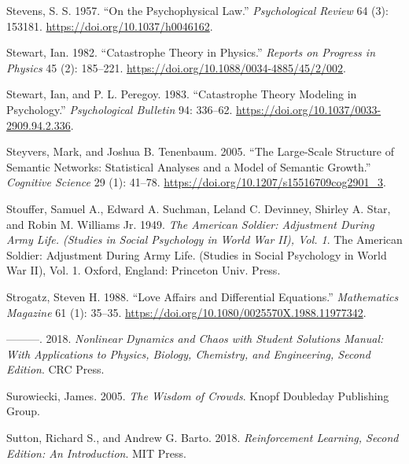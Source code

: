 \documentclass[
  letterpaper,
]{scrbook}
\newlength{\cslhangindent}
\newlength{\cslentryspacingunit} %
\newenvironment{CSLReferences}[2] %
 {%
  \setlength{\parindent}{0pt}
  \ifodd #1
  \let\oldpar\par
  \def\par{\hangindent=\cslhangindent\oldpar}
  \fi
  \setlength{\parskip}{#2\cslentryspacingunit}
 }%
 {}
\begin{document}
\begin{CSLReferences}{1}{0}
\leavevmode{}%
Stevens, S. S. 1957. {``On the Psychophysical Law.''}
\emph{Psychological Review} 64 (3): 153181.
\url{https://doi.org/10.1037/h0046162}.

\leavevmode{}%
Stewart, Ian. 1982. {``Catastrophe Theory in Physics.''} \emph{Reports
on Progress in Physics} 45 (2): 185--221.
\url{https://doi.org/10.1088/0034-4885/45/2/002}.

\leavevmode{}%
Stewart, Ian, and P. L. Peregoy. 1983. {``Catastrophe Theory Modeling in
Psychology.''} \emph{Psychological Bulletin} 94: 336--62.
\url{https://doi.org/10.1037/0033-2909.94.2.336}.

\leavevmode{}%
Steyvers, Mark, and Joshua B. Tenenbaum. 2005. {``The {Large-Scale
Structure} of {Semantic Networks}: {Statistical Analyses} and a {Model}
of {Semantic Growth}.''} \emph{Cognitive Science} 29 (1): 41--78.
\url{https://doi.org/10.1207/s15516709cog2901_3}.

\leavevmode{}%
Stouffer, Samuel A., Edward A. Suchman, Leland C. Devinney, Shirley A.
Star, and Robin M. Williams Jr. 1949. \emph{The {American} Soldier:
{Adjustment} During Army Life. ({Studies} in Social Psychology in {World
War II}), {Vol}. 1}. The {American} Soldier: {Adjustment} During Army
Life. ({Studies} in Social Psychology in {World War II}), {Vol}. 1.
{Oxford, England}: {Princeton Univ. Press}.

\leavevmode{}%
Strogatz, Steven H. 1988. {``Love {Affairs} and {Differential
Equations}.''} \emph{Mathematics Magazine} 61 (1): 35--35.
\url{https://doi.org/10.1080/0025570X.1988.11977342}.

\leavevmode{}%
---------. 2018. \emph{Nonlinear {Dynamics} and {Chaos} with {Student
Solutions Manual}: {With Applications} to {Physics}, {Biology},
{Chemistry}, and {Engineering}, {Second Edition}}. {CRC Press}.

\leavevmode{}%
Surowiecki, James. 2005. \emph{The {Wisdom} of {Crowds}}. {Knopf
Doubleday Publishing Group}.

\leavevmode{}%
Sutton, Richard S., and Andrew G. Barto. 2018. \emph{Reinforcement
{Learning}, Second Edition: {An Introduction}}. {MIT Press}.


\end{CSLReferences}
\end{document}
